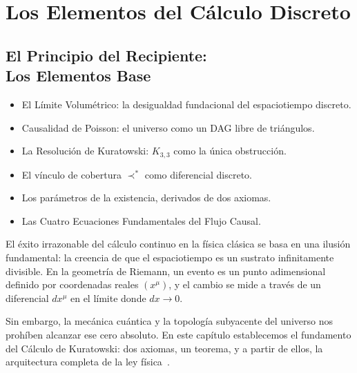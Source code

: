 \documentclass[11pt, a4paper, openany]{book}
\newcommand{\covers}{\prec^{\!*}}
\newenvironment{introduction}[1][Sinopsis del M\'odulo]{%
  \begin{tcolorbox}[
    enhanced,colback=structure!5,colframe=structure,
    colbacktitle=structure,coltitle=white,
    fonttitle=\small\bfseries,title={#1},
    arc=2pt,boxrule=0.7pt,
    left=8pt,right=8pt,top=6pt,bottom=6pt,
    before skip=12pt,after skip=12pt
  ]\itshape\begin{itemize}[leftmargin=*,itemsep=2pt,parsep=0pt]
}{%
  \end{itemize}\end{tcolorbox}
}
\begin{document}
\part{Los Elementos del C\'alculo Discreto}

\chapter[El Principio del Recipiente]{El Principio del Recipiente:\\Los Elementos Base}

\begin{introduction}
  \item El L\'imite Volum\'etrico: la desigualdad fundacional del espaciotiempo discreto.
  \item Causalidad de Poisson: el universo como un DAG libre de tri\'angulos.
  \item La Resoluci\'on de Kuratowski: $K_{3,3}$ como la \'unica obstrucci\'on.
  \item El v\'inculo de cobertura $\covers$ como diferencial discreto.
  \item Los par\'ametros de la existencia, derivados de dos axiomas.
  \item Las Cuatro Ecuaciones Fundamentales del Flujo Causal.
\end{introduction}

El \'exito irrazonable del c\'alculo continuo en la f\'isica cl\'asica
se basa en una ilusi\'on fundamental: la creencia de que el
espaciotiempo es un sustrato infinitamente divisible. En la geometr\'ia
de Riemann, un evento es un punto adimensional definido por coordenadas
reales $(x^\mu)$, y el cambio se mide a trav\'es de un diferencial
$dx^\mu$ en el l\'imite donde $dx \to 0$.

Sin embargo, la mec\'anica cu\'antica y la topolog\'ia subyacente del
universo nos proh\'iben alcanzar ese cero absoluto. En este cap\'itulo
establecemos el fundamento del C\'alculo de Kuratowski: dos axiomas, un
teorema, y a partir de ellos, la arquitectura completa de la ley
f\'isica~\cite{bombelli1987,sorkin2003,surya2019}.

\end{document}
